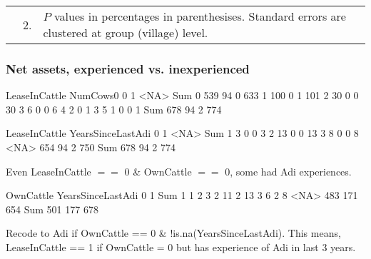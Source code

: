 \begin{minipage}[t]{14cm}
\begin{tabular}{>{\hfill\scriptsize}p{1cm}<{}>{\hfill\scriptsize}p{.25cm}<{}>{\scriptsize}p{12cm}<{\hfill}}
& 2. & $P$ values in percentages in parenthesises. Standard errors are clustered at group (village) level.
\end{tabular}
\end{minipage}

\subsubsection{Net assets, experienced vs. inexperienced}



\begin{Schunk}
\begin{Soutput}
        LeaseInCattle
NumCows0   0   1 <NA> Sum
     0   539  94    0 633
     1   100   0    1 101
     2    30   0    0  30
     3     6   0    0   6
     4     2   0    1   3
     5     1   0    0   1
     Sum 678  94    2 774
\end{Soutput}
\begin{Soutput}
                 LeaseInCattle
YearsSinceLastAdi   0   1 <NA> Sum
             1      3   0    0   3
             2     13   0    0  13
             3      8   0    0   8
             <NA> 654  94    2 750
             Sum  678  94    2 774
\end{Soutput}
\end{Schunk}
Even LeaseInCattle $==$ 0 \& OwnCattle $==$ 0, some had Adi experiences.
\begin{Schunk}
\begin{Soutput}
                 OwnCattle
YearsSinceLastAdi   0   1 Sum
             1      1   2   3
             2     11   2  13
             3      6   2   8
             <NA> 483 171 654
             Sum  501 177 678
\end{Soutput}
\end{Schunk}
Recode to Adi if OwnCattle == 0 \& $!$is.na(YearsSinceLastAdi). This means, \textsf{LeaseInCattle} == 1 if OwnCattle = 0 but has experience of Adi in last 3 years.


